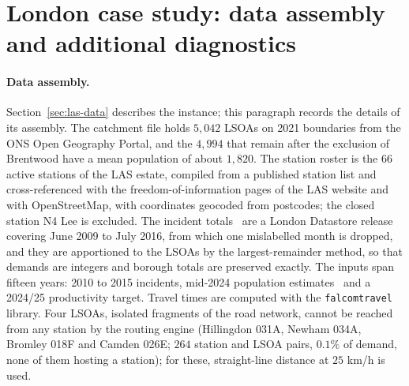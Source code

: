 \documentclass[11pt]{article}
\theoremstyle{definition}
\begin{document}
\section{London case study: data assembly and additional diagnostics}
\label{app:slas}\label{app:london-extra}

\paragraph{Data assembly.}
Section~\ref{sec:las-data} describes the instance; this paragraph records the details of its assembly. The catchment file holds $5{,}042$ LSOAs on 2021 boundaries from the ONS Open Geography Portal, and the $4{,}994$ that remain after the exclusion of Brentwood have a mean population of about $1{,}820$. The station roster is the $66$ active stations of the LAS estate, compiled from a published station list and cross-referenced with the freedom-of-information pages of the LAS website and with OpenStreetMap, with coordinates geocoded from postcodes; the closed station N4 Lee is excluded. The incident totals~\citep{las_incidents} are a London Datastore release covering June 2009 to July 2016, from which one mislabelled month is dropped, and they are apportioned to the LSOAs by the largest-remainder method, so that demands are integers and borough totals are preserved exactly. The inputs span fifteen years: 2010 to 2015 incidents, mid-2024 population estimates~\citep{ons_sape2024} and a 2024/25 productivity target. Travel times are computed with the \texttt{falcomtravel} library. Four LSOAs, isolated fragments of the road network, cannot be reached from any station by the routing engine (Hillingdon 031A, Newham 034A, Bromley 018F and Camden 026E; $264$ station and LSOA pairs, $0.1\%$ of demand, none of them hosting a station); for these, straight-line distance at $25$ km/h is used.
\end{document}
